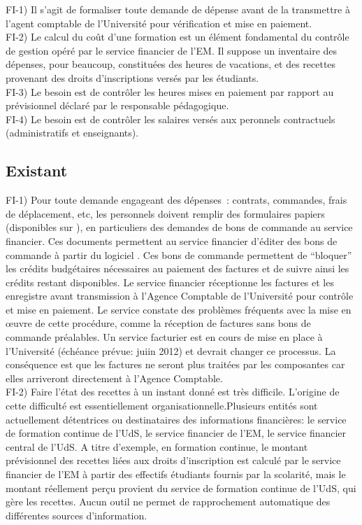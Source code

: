 \documentclass{book}
\begin{document}
\bigskip
FI-1) Il s'agit de formaliser toute demande de dépense avant de la transmettre
à l'agent comptable de l'Université pour vérification et mise en paiement. \\

FI-2) Le calcul du coût d'une formation est un élément fondamental du contrôle
de gestion opéré par le service financier de l'EM. Il suppose un inventaire
des dépenses, pour beaucoup, constituées des heures de vacations, et des recettes
provenant des droits d'inscriptions versés par les étudiants. \\

FI-3) Le besoin est de contrôler les heures mises en paiement par rapport
au prévisionnel déclaré par le responsable pédagogique.\\

FI-4) Le besoin est de contrôler les salaires versés aux peronnels contractuels
(administratifs et enseignants).\\


\subsection{Existant}

FI-1) Pour toute demande engageant des dépenses~: contrats, commandes, frais 
de déplacement, etc, les personnels doivent remplir des formulaires papiers 
(disponibles sur ), en particuliers des demandes de bons de commande 
au service financier. Ces documents permettent au service financier d'éditer 
des bons de commande à partir du logiciel . Ces bons de commande 
permettent de ``bloquer'' les crédits budgétaires nécessaires au paiement des 
factures et de suivre ainsi les crédits restant disponibles. Le service financier
réceptionne les factures et les enregistre avant transmission à l'Agence
Comptable de l'Université pour contrôle et mise en paiement.
Le service constate des problèmes fréquents avec la mise en {\oe}uvre de cette
procédure, comme la réception de factures sans bons de commande préalables.
Un service facturier est en cours de mise en place à l'Université (échéance
prévue: juiin 2012) et devrait changer ce processus. La conséquence est que
les factures ne seront plus traitées par les composantes car elles arriveront
directement à l'Agence Comptable.\\

FI-2) Faire l'état des recettes à un instant donné est très difficile. L'origine
de cette difficulté est essentiellement organisationnelle.Plusieurs entités sont
actuellement détentrices ou destinataires des informations financières:
le service de formation continue de l'UdS, le service financier de l'EM,
le service financier central de l'UdS. A titre d'exemple, en formation continue, 
le montant prévisionnel des recettes liées aux droits d'inscription est calculé 
par le service financier de l'EM à partir des effectifs étudiants fournis par la
scolarité, mais le montant réellement perçu provient du service de formation 
continue de l'UdS, qui gère les recettes. Aucun outil ne permet de rapprochement 
automatique des différentes sources d'information.
\end{document}
